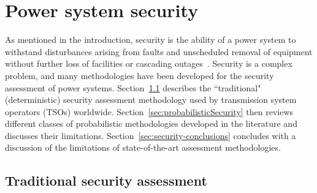 \chapter{Power system security}
\label{ch:security}




As mentioned in the introduction, security is the ability of a power system to withstand disturbances arising from faults and unscheduled removal of equipment without further loss of facilities or cascading outages~\cite{AdequancySecurityDefinition}. Security is a complex problem, and many methodologies have been developed for the security assessment of power systems. Section~\ref{sec:traditionalSecurity} describes the ``traditional" (deterministic) security assessment methodology used by transmission system operators (TSOs) worldwide. Section~\ref{sec:probabilisticSecurity} then reviews different classes of probabilistic methodologies developed in the literature and discusses their limitations. Section~\ref{sec:security-conclusions} concludes with a discussion of the limitations of state-of-the-art assessment methodologies.



\section{Traditional security assessment}
\label{sec:traditionalSecurity}

